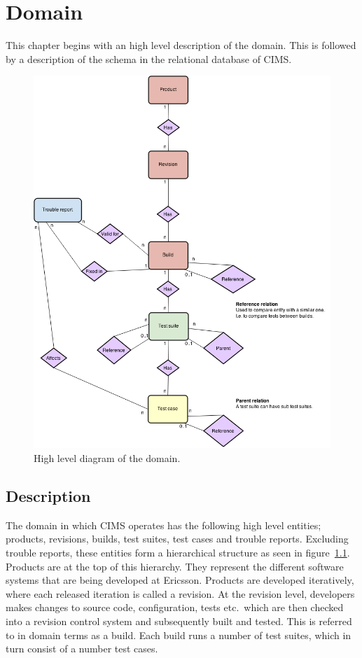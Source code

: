 \chapter{Domain}
\label{chap:domain}

This chapter begins with an high level description of the domain. This is followed by a description of the schema in the relational database of CIMS.
\begin{figure}[h!]
\centering
\includegraphics[scale=0.5]{figure/er_diagram.png}
\caption{High level diagram of the domain.}
\label{fig:er}
\end{figure}
\section{Description}
The domain in which CIMS operates has the following high level entities; products, revisions, builds, test suites, test cases and trouble reports. Excluding trouble reports, these entities form a hierarchical structure as seen in figure~\ref{fig:er}. Products are at the top of this hierarchy. They represent the different software systems that are being developed at Ericsson. Products are developed iteratively, where each released iteration is called a revision. At the revision level, developers makes changes to source code, configuration, tests etc.\ which are then checked into a revision control system and subsequently built and tested. This is referred to in domain terms as a build. Each build runs a number of test suites, which in turn consist of a number test cases.

